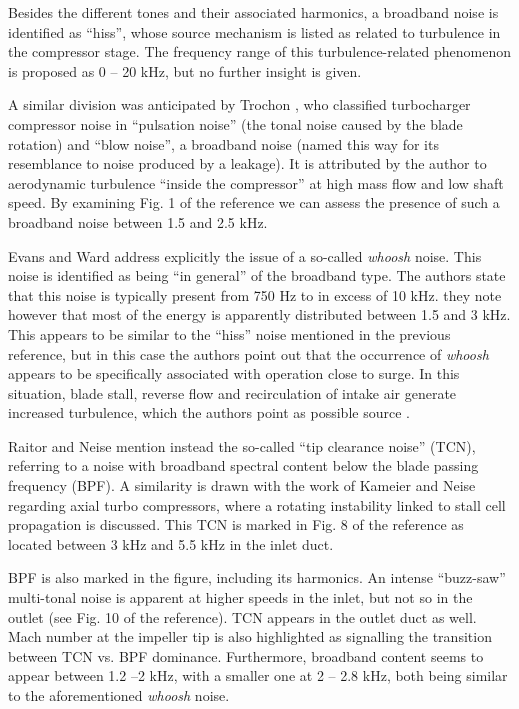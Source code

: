 Besides the different tones and their associated harmonics, a broadband noise is identified as ``hiss'', whose source mechanism is listed as related to turbulence in the compressor stage. The frequency range of this turbulence-related phenomenon is proposed as 0 -- 20 kHz, but no further insight is given.

A similar division was anticipated by Trochon \cite{trochon2001new}, who classified turbocharger compressor noise in ``pulsation noise'' (the tonal noise caused by the blade rotation) and ``blow noise'', a broadband noise (named this way for its resemblance to noise produced by a leakage). It is attributed by the author to aerodynamic turbulence ``inside the compressor'' at high mass flow and low shaft speed. By examining Fig. 1 of the reference we can assess the presence of such a broadband noise between 1.5 and 2.5 kHz.

Evans and Ward \cite{evans2005minimizing} address explicitly the issue of a so-called \emph{whoosh} noise. This noise is identified as being ``in general'' of the broadband type. The authors state that this noise is typically present from 750 Hz to in excess of 10 kHz. they note however that most of the energy is apparently distributed between 1.5 and 3 kHz. This appears to be similar to the ``hiss'' noise mentioned in the previous reference, but in this case the authors point out that the occurrence of \emph{whoosh} appears to be specifically associated with operation close to surge. In this situation, blade stall, reverse flow and recirculation of intake air generate increased turbulence, which the authors point as possible source .

Raitor and Neise \cite{raitor2008sound} mention instead the so-called ``tip clearance noise'' (TCN), referring to a noise with broadband spectral content below the blade passing frequency (BPF). A similarity is drawn with the work of Kameier and Neise \cite{kameier1997rotating} regarding axial turbo compressors, where a rotating instability linked to stall cell propagation is discussed. This TCN is marked in Fig. 8 of the reference as located between 3 kHz and 5.5 kHz in the inlet duct. 

BPF is also marked in the figure, including its harmonics. An intense ``buzz-saw'' multi-tonal noise is apparent at higher speeds in the inlet, but not so in the outlet (see Fig. 10 of the reference). TCN appears in the outlet duct as well. Mach number at the impeller tip is also highlighted as signalling the transition between TCN vs. BPF dominance. Furthermore, broadband content seems to appear between 1.2 --2 kHz, with a smaller one at 2 -- 2.8 kHz, both being similar to the aforementioned \emph{whoosh} noise.

